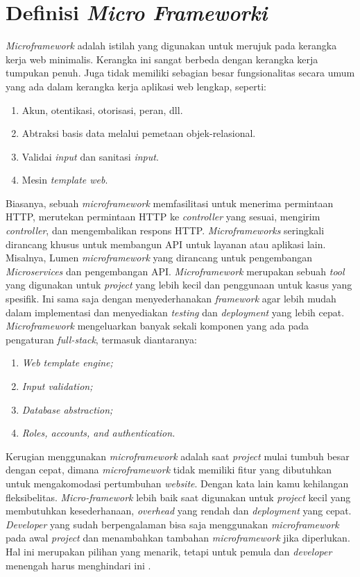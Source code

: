 \section{Definisi \textit{Micro Frameworki}}

\textit{Microframework} adalah istilah yang digunakan untuk merujuk pada kerangka kerja web minimalis. Kerangka ini sangat berbeda dengan kerangka kerja tumpukan penuh. Juga tidak memiliki sebagian besar fungsionalitas secara umum yang ada dalam kerangka kerja aplikasi web lengkap, seperti:
\begin{enumerate}
\item Akun, otentikasi, otorisasi, peran, dll.
\item Abtraksi basis data melalui pemetaan objek-relasional.
\item Validai  \textit{input} dan sanitasi \textit{input}.
\item Mesin \textit{template web}.
\end{enumerate}

Biasanya, sebuah \textit{microframework} memfasilitasi untuk menerima permintaan HTTP, merutekan permintaan HTTP ke \textit{controller} yang sesuai, mengirim \textit{controller}, dan mengembalikan respons HTTP. \textit{Microframeworks} seringkali dirancang khusus untuk membangun API untuk layanan atau aplikasi lain. Misalnya, Lumen \textit{microframework} yang dirancang untuk pengembangan \textit{Microservices} dan pengembangan API. \textit{Microframework} merupakan sebuah \textit{tool} yang digunakan untuk \textit{project} yang lebih kecil dan penggunaan untuk kasus yang spesifik. Ini sama saja dengan menyederhanakan \textit{framework} agar lebih mudah dalam implementasi dan menyediakan \textit{testing} dan \textit{deployment} yang lebih cepat. \textit{Microframework} mengeluarkan banyak sekali komponen yang ada pada pengaturan \textit{full-stack}, termasuk diantaranya:
\begin{enumerate}
\item \textit{Web template engine;}
\item \textit{Input validation;}
\item \textit{Database abstraction;}
\item \textit{Roles, accounts, and authentication.}
\end{enumerate}

Kerugian menggunakan  \textit{microframework} adalah saat  \textit{project} mulai tumbuh besar dengan cepat, dimana  \textit{microframework} tidak memiliki fitur yang dibutuhkan untuk mengakomodasi pertumbuhan  \textit{website}. Dengan kata lain kamu kehilangan fleksibelitas.  \textit{Micro-framework} lebih baik saat digunakan untuk  \textit{project} kecil yang membutuhkan kesederhanaan,  \textit{overhead} yang rendah dan  \textit{deployment} yang cepat.  \textit{Developer} yang sudah berpengalaman bisa saja menggunakan  \textit{microframework} pada awal  \textit{project} dan menambahkan tambahan  \textit{microframework} jika diperlukan. Hal ini merupakan pilihan yang menarik, tetapi untuk pemula dan  \textit{developer} menengah harus menghindari ini \cite{fadhilnet}.

